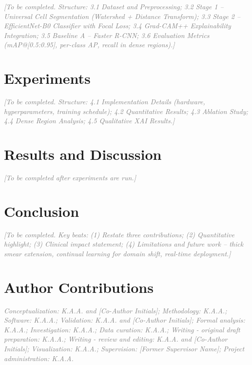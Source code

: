 \documentclass[10pt,twocolumn]{article}
\newcommand{\placeholder}[1]{\textcolor{gray}{\textit{#1}}}
\begin{document}
\placeholder{[To be completed. Structure: 3.1 Dataset and Preprocessing;
3.2 Stage 1 -- Universal Cell Segmentation (Watershed + Distance Transform);
3.3 Stage 2 -- EfficientNet-B0 Classifier with Focal Loss;
3.4 Grad-CAM++ Explainability Integration;
3.5 Baseline A -- Faster R-CNN;
3.6 Evaluation Metrics (mAP@[0.5:0.95], per-class AP, recall in dense regions).]}

\section{Experiments}
\label{sec:experiments}

\placeholder{[To be completed. Structure: 4.1 Implementation Details
(hardware, hyperparameters, training schedule); 4.2 Quantitative Results;
4.3 Ablation Study; 4.4 Dense Region Analysis; 4.5 Qualitative XAI Results.]}

\section{Results and Discussion}
\label{sec:results}

\placeholder{[To be completed after experiments are run.]}

\section{Conclusion}
\label{sec:conclusion}

\placeholder{[To be completed. Key beats: (1) Restate three contributions;
(2) Quantitative highlight; (3) Clinical impact statement;
(4) Limitations and future work -- thick smear extension, continual
learning for domain shift, real-time deployment.]}

\section*{Author Contributions}
\placeholder{Conceptualization: K.A.A. and [Co-Author Initials]; Methodology: K.A.A.; Software: K.A.A.; 
Validation: K.A.A. and [Co-Author Initials]; Formal analysis: K.A.A.; Investigation: K.A.A.; 
Data curation: K.A.A.; Writing - original draft preparation: K.A.A.; 
Writing - review and editing: K.A.A. and [Co-Author Initials]; Visualization: K.A.A.; 
Supervision: [Former Supervisor Name]; Project administration: K.A.A.}
\end{document}
